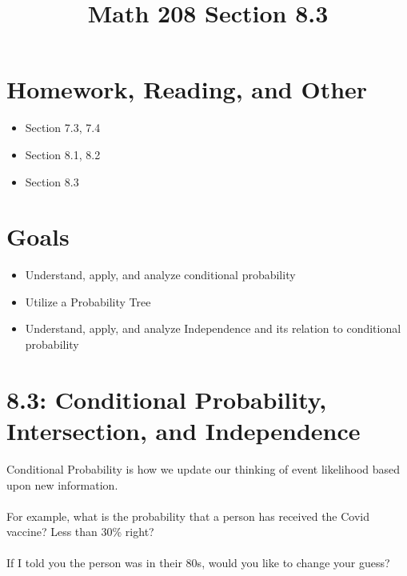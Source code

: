 \documentclass[14pt]{extarticle}
\title{\vspace{-5ex}Math 208 Section 8.3}
\date{\vspace{-10ex}}
\begin{document}
\maketitle		
\section*{Homework, Reading, and Other}
\begin{itemize}
	\item Section 7.3, 7.4
	\item Section 8.1, 8.2
	\item Section 8.3
\end{itemize}

\section{Goals}
\begin{itemize}
	\item Understand, apply, and analyze conditional probability
	\item Utilize a Probability Tree
	\item Understand, apply, and analyze Independence and its relation to conditional probability
\end{itemize}

\section{8.3: Conditional Probability, Intersection, and Independence}
Conditional Probability is how we update our thinking of event likelihood based upon new information.
\\\\
For example, what is the probability that a person has received the Covid vaccine? Less than 30\% right?
\\\\
If I told you the person was in their 80s, would you like to change your guess?
\end{document}
